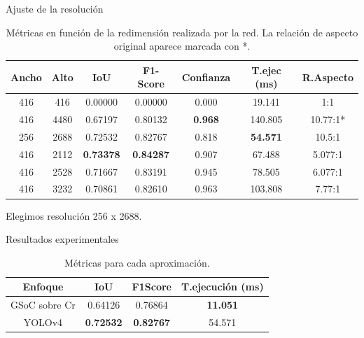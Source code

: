 \documentclass[11pt]{beamer}
\begin{document}
        \begin{frame}{Ajuste de la resolución}
            \begin{table}
                \centering
                \scriptsize
                \begin{tabular}{| c | c | c | c | c | c | c| } \hline
                    Ancho & Alto & IoU & F1-Score & Confianza & T.ejec (ms) & R.Aspecto \\ \hline
                    416 & 416 & 0.00000 & 0.00000 & 0.000 & 19.141 & 1:1 \\
                    416 & 4480 & 0.67197 & 0.80132 & \textbf{0.968} & 140.805 & 10.77:1* \\ 
                    256 & 2688 & 0.72532 & 0.82767 & 0.818 & \textbf{54.571} & 10.5:1 \\ 
                    416 & 2112 & \textbf{0.73378} & \textbf{0.84287} & 0.907 & 67.488 & 5.077:1  \\
                    416 & 2528 & 0.71667 & 0.83191 & 0.945 & 78.505 & 6.077:1 \\ 
                    416 & 3232 & 0.70861 & 0.82610 &  0.963 & 103.808 & 7.77:1 \\ \hline
                \end{tabular}
                \caption{Métricas en función de la redimensión realizada por la red. La relación de aspecto original aparece marcada con *.}
                \label{tab:yolosizematters}
            \end{table}
            Elegimos resolución 256 x 2688.
        \end{frame}
        
        \begin{frame}{Resultados experimentales}
            \begin{table}
                \centering
                \begin{tabular}{| c | c | c | c | } \hline
                    Enfoque & IoU & F1Score  & T.ejecución (ms)  \\ \hline
                    GSoC sobre Cr & 0.64126 & 0.76864 & \textbf{11.051} \\
                    YOLOv4 & \textbf{0.72532} & \textbf{0.82767} & 54.571  \\ \hline
                \end{tabular}
                \caption{Métricas para cada aproximación.}
                \label{tab:metricasaproximaciones}
            \end{table}
        \end{frame}
        
\end{document}
